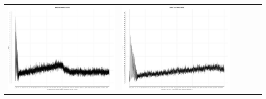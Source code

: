 \begin{table}[htbp]
{\begin{tabular}{l | ccccc}
\begin{minipage}{.15\textwidth}
     			 	\includegraphics[width=\linewidth]{images/mema-triple/N4}
    				 \end{minipage}
    			   &	 \begin{minipage}{.15\textwidth}
     			 	\includegraphics[width=\linewidth]{images/mema-triple/N8}
    				 \end{minipage}
    			   &	 \begin{minipage}{.15\textwidth}

\end{minipage}
\end{tabular}}
\end{table}
